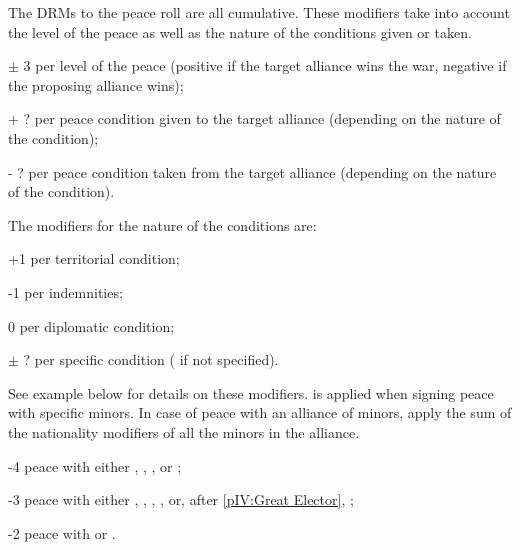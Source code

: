\label{chPeace:peace minors modifiers}
The DRMs to the peace roll are all cumulative.
 These modifiers take into account the level of
the peace as well as the nature of the conditions given or taken.
\begin{modlist}
\item[$\pm$ 3] per level of the peace (positive if the target alliance wins
  the war, negative if the proposing alliance wins);
\item[+ ?] per peace condition given to the target alliance (depending on the
  nature of the condition);
\item[- ?] per peace condition taken from the target alliance (depending on
  the nature of the condition).
\end{modlist}
\bparag The modifiers for the nature of the conditions are:
\begin{modlist}
\item[+1] per territorial condition;
\item[-1] per indemnities;
\item[0] per diplomatic condition;
\item[$\pm$ ?] per specific condition ( if not specified).
\end{modlist}
See example below for details on these modifiers.
 is applied when signing peace with specific
minors. In case of peace with an alliance of minors, apply the sum of the
nationality modifiers of all the minors in the alliance.
\begin{modlist}
\item[-4] peace with either \paysPerse, \paysEgypte, \paysDamas, \paysChine or
  \paysJapon;
\item[-3] peace with either \paysUSA, \paysMogol, \paysVenise, \paysPologne,
  \paysHabsbourg or, after \ref{pIV:Great Elector}, \paysBrandebourg;
\item[-2] peace with \paysPortugal or \paysDanemark.
\end{modlist}
~

